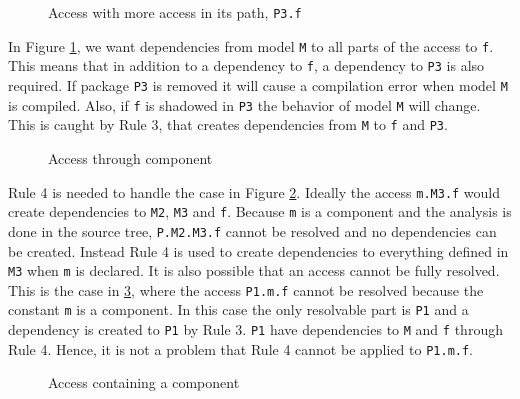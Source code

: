 \documentclass{cslthse-msc}
\begin{document}
\begin{figure}[!htbp]
    \centering
    \qquad
    \caption{Access with more access in its path, \texttt{P3.f}}
    \label{fig:dotAccess}
\end{figure}

In Figure \ref{fig:dotAccess}, we want dependencies from model \texttt{M} to all parts of the access to \texttt{f}. This means that in addition to a dependency to \texttt{f}, a dependency to \texttt{P3} is also required. If package \texttt{P3} is removed it will cause a compilation error when model \texttt{M} is compiled. Also, if \texttt{f} is shadowed in \texttt{P3} the behavior of model \texttt{M} will change. This is caught by Rule 3, that creates dependencies from \texttt{M} to \texttt{f} and \texttt{P3}.


\begin{figure}[!htbp]
    \centering
    \qquad
    \subfloat{\raisebox{4.7 cm}{}}
    \caption{Access through component}
    \label{fig:component}
\end{figure}

Rule 4 is needed to handle the case in Figure \ref{fig:component}. Ideally the access \texttt{m.M3.f} would create dependencies to \texttt{M2}, \texttt{M3} and \texttt{f}. Because \texttt{m} is a component and the analysis is done in the source tree, \texttt{P.M2.M3.f} cannot be resolved and no dependencies can be created. Instead Rule 4 is used to create dependencies to everything defined in \texttt{M3} when \texttt{m} is declared.
It is also possible that an access cannot be fully resolved. This is the case in \ref{fig:brokenAccess}, where the access \texttt{P1.m.f} cannot be resolved because the constant \texttt{m} is a component. In this case the only resolvable part is \texttt{P1} and a  dependency is created to \texttt{P1} by Rule 3. \texttt{P1} have dependencies to \texttt{M} and \texttt{f} through Rule 4. Hence, it is not a problem that Rule 4 cannot be applied to \texttt{P1.m.f}.

\begin{figure}[!htbp]
    \centering
    \qquad
    \subfloat{\raisebox{4.0 cm}{}}
    \caption{Access containing a component}
    \label{fig:brokenAccess}
\end{figure}
\end{document}
